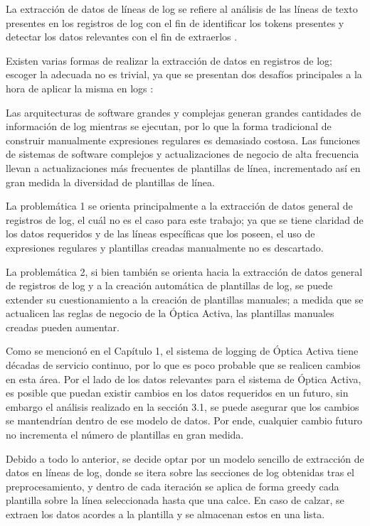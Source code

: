 La extracción de datos de líneas de log se refiere al análisis de las líneas de texto presentes en los registros de log con el fin de identificar los tokens presentes y detectar los datos relevantes con el fin de extraerlos \cite{jayathilake2011mind}. 

Existen varias formas de realizar la extracción de datos en registros de log; escoger la adecuada no es trivial, ya que se presentan dos desafíos principales a la hora de aplicar la misma en logs \cite{jayathilake2011mind}:

Las arquitecturas de software grandes y complejas generan grandes cantidades de información de log mientras se ejecutan, por lo que la forma tradicional de construir manualmente expresiones regulares es demasiado costosa.
Las funciones de sistemas de software complejos y actualizaciones de negocio de alta frecuencia llevan a actualizaciones más frecuentes de plantillas de línea, incrementado así en gran medida la diversidad de plantillas de línea.

La problemática 1 se orienta principalmente a la extracción de datos general de registros de log, el cuál no es el caso para este trabajo; ya que se tiene claridad de los datos requeridos y de las líneas específicas que los poseen, el uso de expresiones regulares y plantillas creadas manualmente no es descartado.

La problemática 2, si bien también se orienta hacia la extracción de datos general de registros de log y a la creación automática de plantillas de log, se puede extender su cuestionamiento a la creación de plantillas manuales; a medida que se actualicen las reglas de negocio de la Óptica Activa, las plantillas manuales creadas pueden aumentar.

Como se mencionó en el Capítulo 1, el sistema de logging de Óptica Activa tiene décadas de servicio continuo, por lo que es poco probable que se realicen cambios en esta área. Por el lado de los datos relevantes para el sistema de Óptica Activa, es posible que puedan existir cambios en los datos requeridos en un futuro, sin embargo el análisis realizado en la sección 3.1, se puede asegurar que los cambios se mantendrían dentro de ese modelo de datos. Por ende, cualquier cambio futuro no incrementa el número de plantillas en gran medida.

Debido a todo lo anterior, se decide optar por un modelo sencillo de extracción de datos en líneas de log, donde se itera sobre las secciones de log obtenidas tras el preprocesamiento, y dentro de cada iteración se aplica de forma greedy cada plantilla sobre la línea seleccionada hasta que una calce. En caso de calzar, se extraen los datos acordes a la plantilla y se almacenan estos en una lista.

